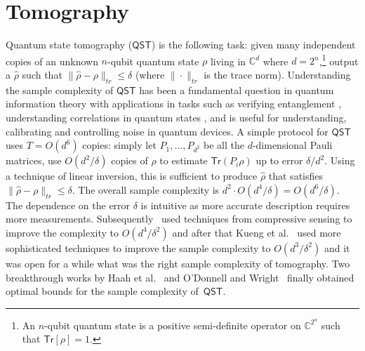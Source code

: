 \documentclass[11pt]{article}
\newcommand{\Tr}{\textsf{Tr}}
\begin{document}

\section{Tomography}
\label{sec:tomography}
Quantum state tomography ($\textsf{QST}$) is the following task: given many independent copies of an unknown $n$-qubit quantum state $\rho$ living in $\mathbb{C}^{d}$ where $d=2^n$,\footnote{An $n$-qubit quantum state is a positive semi-definite operator on $\mathbb{C}^{2^n}$ such that $\Tr[\rho] = 1$.} output a $\hat{\rho}$ such that $\|\hat{\rho}-\rho\|_{tr}\leq \delta$ (where $\|\cdot \|_{tr}$ is the trace norm). Understanding the sample complexity of $\textsf{QST}$ has been a fundamental question in quantum information theory with applications in tasks such as verifying entanglement \cite{Kokail2021}, understanding correlations in quantum states \cite{cramer2010efficient}, and is useful for  understanding, calibrating and controlling noise in   quantum devices. A simple protocol for $\textsf{QST}$ uses  $T=O(d^6)$ copies: simply let $P_1,\ldots,P_{d^2}$ be all the $d$-dimensional Pauli matrices, use $O(d^2/\delta)$ copies of $\rho$ to estimate $\Tr(P_i\rho)$ up to error $\delta/d^2$. Using a technique of linear inversion, this is sufficient to produce $\hat{\rho}$ that satisfies  $\|\hat{\rho}-\rho\|_{tr}\leq \delta$. The overall sample complexity is $d^2\cdot O(d^4/\delta)=O(d^6/\delta)$. The dependence on the error $\delta$ is intuitive as more accurate description requires more measurements. Subsequently~\cite{flammia2012quantum} used techniques from compressive sensing to improve the complexity to $O(d^4/\delta^2)$ and after that Kueng et al.~\cite{kueng2017low} used more sophisticated techniques to improve the sample complexity to $O(d^3/\delta^2)$ and it was open for a while what was the right sample complexity of tomography. Two breakthrough works by Haah et al.~\cite{haah2017sample} and O'Donnell and Wright~\cite{o2016efficient} finally obtained optimal bounds for  the sample complexity of~$\textsf{QST}$. 
\end{document}
